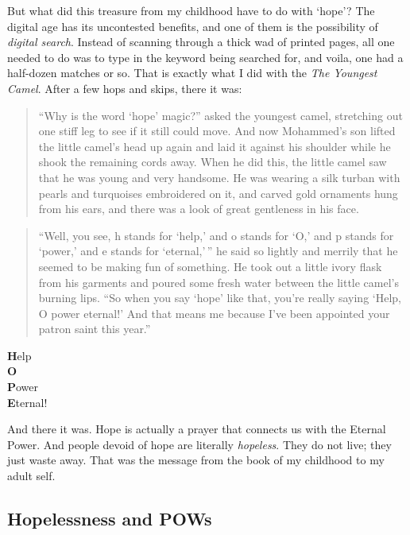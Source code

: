 \documentclass[
  a4paper,
]{article}
\begin{document}
But what did this treasure from my childhood have to do with `hope'? The
digital age has its uncontested benefits, and one of them is the
possibility of \emph{digital search}. Instead of scanning through a
thick wad of printed pages, all one needed to do was to type in the
keyword being searched for, and voila, one had a half-dozen matches or
so. That is exactly what I did with the \emph{The Youngest Camel}. After
a few hops and skips, there it was:

\begin{quote}
``Why is the word `hope' magic?'' asked the youngest camel, stretching
out one stiff leg to see if it still could move. And now Mohammed's son
lifted the little camel's head up again and laid it against his shoulder
while he shook the remaining cords away. When he did this, the little
camel saw that he was young and very handsome. He was wearing a silk
turban with pearls and turquoises embroidered on it, and carved gold
ornaments hung from his ears, and there was a look of great gentleness
in his face.
\end{quote}

\begin{quote}
``Well, you see, h stands for `help,' and o stands for `O,' and p stands
for `power,' and e stands for `eternal,'\,'' he said so lightly and
merrily that he seemed to be making fun of something. He took out a
little ivory flask from his garments and poured some fresh water between
the little camel's burning lips. ``So when you say `hope' like that,
you're really saying `Help, O power eternal!' And that means me because
I've been appointed your patron saint this year.''
\end{quote}

\begin{center}

\textbf{H}elp\\
\textbf{O}\\
\textbf{P}ower\\
\textbf{E}ternal!

\end{center}

And there it was. Hope is actually a prayer that connects us with the
Eternal Power. And people devoid of hope are literally \emph{hopeless}.
They do not live; they just waste away. That was the message from the
book of my childhood to my adult self.

\subsection{Hopelessness and POWs}\label{hopelessness-and-pows}
\end{document}
